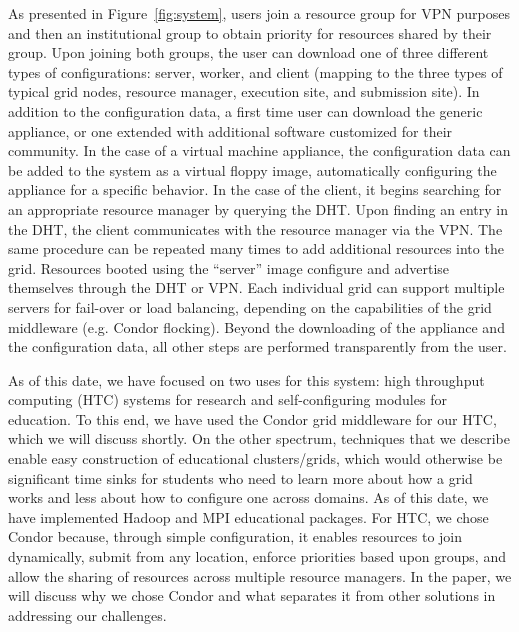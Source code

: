 \documentclass[conference]{IEEEtran}
\begin{document}
As presented in Figure~\ref{fig:system}, users join a resource group for VPN
purposes and then an institutional group to obtain priority for resources
shared by their group.  Upon joining both groups, the user can download one of
three different types of configurations: server, worker, and client (mapping to
the three types of typical grid nodes, resource manager, execution site, and
submission site).  In addition to the configuration data, a first time user can
download the generic appliance, or one extended with additional software
customized for their community.  In the case of a virtual machine appliance,
the configuration data can be added to the system as a virtual floppy image,
automatically configuring the appliance for a specific behavior.  In the case
of the client, it begins searching for an appropriate resource manager by
querying the DHT.  Upon finding an entry in the DHT, the client communicates
with the resource manager via the VPN.  The same procedure can be repeated many
times to add additional resources into the grid.  Resources booted using the
``server'' image configure and advertise themselves through the DHT or VPN.
Each individual grid can support multiple servers for fail-over or load
balancing, depending on the capabilities of the grid middleware (e.g. Condor
flocking).  Beyond the downloading of the appliance and the configuration data,
all other steps are performed transparently from the user.

As of this date, we have focused on two uses for this system: high throughput
computing (HTC) systems for research and self-configuring modules for
education.  To this end, we have used the Condor grid middleware for our HTC,
which we will discuss shortly.  On the other spectrum, techniques that we
describe enable easy construction of educational clusters/grids, which would
otherwise be significant time sinks for students who need to learn more about
how a grid works and less about how to configure one across domains.  As of
this date, we have implemented Hadoop and MPI educational packages.  For HTC,
we chose Condor because, through simple configuration, it enables resources to
join dynamically, submit from any location, enforce priorities based upon
groups, and allow the sharing of resources across multiple resource managers.
In the paper, we will discuss why we chose Condor and what separates it from
other solutions in addressing our challenges.
\end{document}

